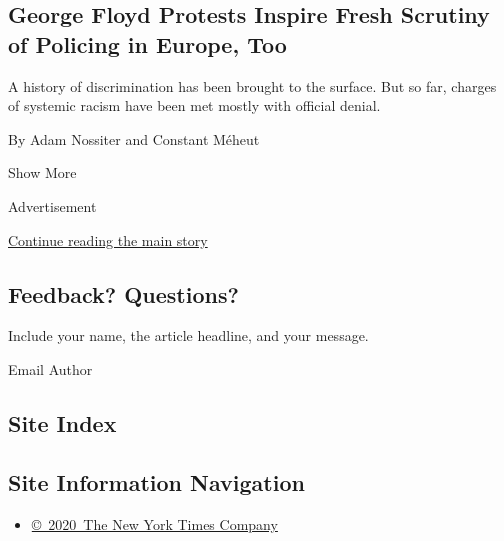 \begin{enumerate}
  \hypertarget{george-floyd-protests-inspire-fresh-scrutiny-of-policing-in-europe-too}{%
  \subsection{George Floyd Protests Inspire Fresh Scrutiny of Policing
  in Europe,
  Too}\label{george-floyd-protests-inspire-fresh-scrutiny-of-policing-in-europe-too}}

  A history of discrimination has been brought to the surface. But so
  far, charges of systemic racism have been met mostly with official
  denial.

  By Adam Nossiter and Constant Méheut
\end{enumerate}

Show More

Advertisement

\protect\hyperlink{after-mid2}{Continue reading the main story}

\hypertarget{feedback-questions}{%
\subsection{Feedback? Questions?}\label{feedback-questions}}

Include your name, the article headline, and your message.

Email Author

\hypertarget{site-index}{%
\subsection{Site Index}\label{site-index}}

\hypertarget{site-information-navigation}{%
\subsection{Site Information
Navigation}\label{site-information-navigation}}

\begin{itemize}
\tightlist
\item
  \href{https://help.nytimes3xbfgragh.onion/hc/en-us/articles/115014792127-Copyright-notice}{©~2020~The
  New York Times Company}
\end{itemize}


